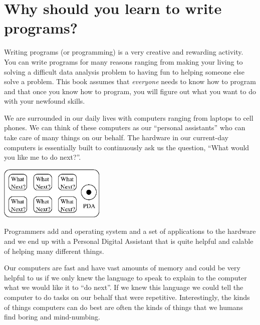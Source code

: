 \documentclass[10pt]{book}
\begin{document}
\clearemptydoublepage

\begin{latexonly}

\tableofcontents

\clearemptydoublepage

\end{latexonly}

\mainmatter

\chapter{Why should you learn to write programs?}

Writing programs (or programming) is a very creative 
and rewarding activity.  You can write programs for 
many reasons ranging from making your living to solving
a difficult data analysis problem to having fun to helping
someone else solve a problem.  This book assumes that 
{\em everyone} needs to know how to program and that once 
you know how to program, you will figure out what you want 
to do with your newfound skills.  

We are surrounded in our daily lives with computers ranging 
from laptops to cell phones.  We can think of these computers
as our ``personal assistants'' who can take care of many things
on our behalf.  The hardware in our current-day computers 
is essentially built to continuously ask us the question, 
``What would you like me to do next?''.

\beforefig
\centerline{\includegraphics[height=1.00in]{figs2/pda.eps}}
\afterfig

Programmers add and operating system and a set of applications
to the hardware and we end up with a Personal Digital
Assistant that is quite helpful and calable of helping
many different things.

Our computers are fast and have vast amounts of memory and 
could be very helpful to us if we only knew the language to
speak to explain to the computer what we would like it to 
``do next''.  If we knew this language we could tell the 
computer to do tasks on our behalf that were repetitive.  
Interestingly, the kinds of things computers can do best
are often the kinds of things that we humans find boring
and mind-numbing.
\end{document}
